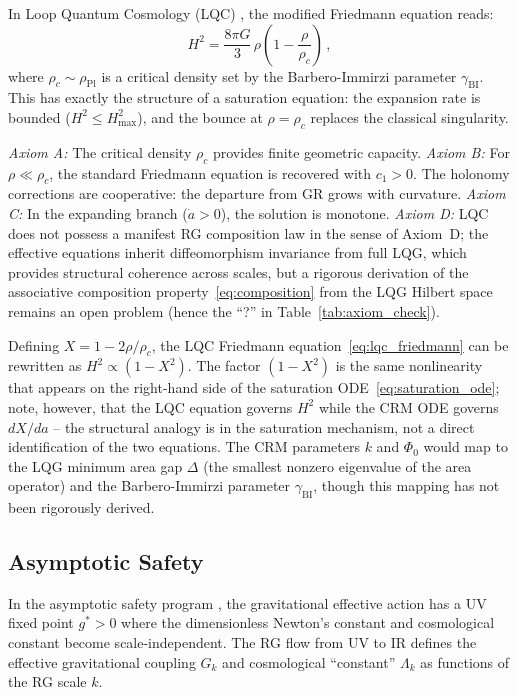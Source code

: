 \documentclass[aps,prd,twocolumn,superscriptaddress,nofootinbib]{revtex4-2}
\begin{document}
In Loop Quantum Cosmology (LQC) \cite{Ashtekar2006,Bojowald2008}, the modified Friedmann equation reads:
\begin{equation}
H^2 = \frac{8\pi G}{3}\,\rho\!\left(1 - \frac{\rho}{\rho_c}\right)\,,
\label{eq:lqc_friedmann}
\end{equation}
where $\rho_c \sim \rho_{\mathrm{Pl}}$ is a critical density set by the Barbero-Immirzi parameter $\gamma_{\mathrm{BI}}$. This has exactly the structure of a saturation equation: the expansion rate is bounded ($H^2 \leq H_{\max}^2$), and the bounce at $\rho = \rho_c$ replaces the classical singularity.

\textit{Axiom A:} The critical density $\rho_c$ provides finite geometric capacity. \textit{Axiom B:} For $\rho \ll \rho_c$, the standard Friedmann equation is recovered with $c_1 > 0$. The holonomy corrections are cooperative: the departure from GR grows with curvature. \textit{Axiom C:} In the expanding branch ($\dot{a} > 0$), the solution is monotone. \textit{Axiom D:} LQC does not possess a manifest RG composition law in the sense of Axiom~D; the effective equations inherit diffeomorphism invariance from full LQG, which provides structural coherence across scales, but a rigorous derivation of the associative composition property~\eqref{eq:composition} from the LQG Hilbert space remains an open problem (hence the ``?'' in Table~\ref{tab:axiom_check}).

Defining $X = 1 - 2\rho/\rho_c$, the LQC Friedmann equation~\eqref{eq:lqc_friedmann} can be rewritten as $H^2 \propto (1 - X^2)$. The factor $(1-X^2)$ is the same nonlinearity that appears on the right-hand side of the saturation ODE~\eqref{eq:saturation_ode}; note, however, that the LQC equation governs $H^2$ while the CRM ODE governs $dX/da$ -- the structural analogy is in the saturation mechanism, not a direct identification of the two equations. The CRM parameters $k$ and $\Phi_0$ would map to the LQG minimum area gap $\Delta$ (the smallest nonzero eigenvalue of the area operator) and the Barbero-Immirzi parameter $\gamma_{\mathrm{BI}}$, though this mapping has not been rigorously derived.

\subsection{Asymptotic Safety}

In the asymptotic safety program \cite{Weinberg1979,Reuter1998,Percacci2017}, the gravitational effective action has a UV fixed point $g^* > 0$ where the dimensionless Newton's constant and cosmological constant become scale-independent. The RG flow from UV to IR defines the effective gravitational coupling $G_k$ and cosmological ``constant'' $\Lambda_k$ as functions of the RG scale $k$.
\end{document}
